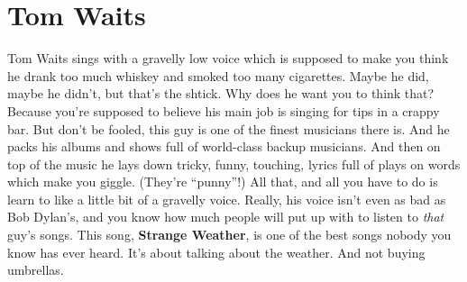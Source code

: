\documentclass[letterpaper,single]{article}
\begin{document}
\section{Tom Waits}
Tom Waits sings with a gravelly low voice which is supposed to make you
think he drank too much whiskey and smoked too many cigarettes. Maybe
he did, maybe he didn't, but that's the shtick. Why does he want you to
think that? Because you're supposed to believe his main job is singing
for tips in a crappy bar. But don't be fooled, this guy is one of the
finest musicians there is. And he packs his albums and shows full of
world-class backup musicians. And then on top of the music he lays down
tricky, funny, touching, lyrics full of plays on words which make you
giggle. (They're ``punny''!) All that, and all you have to do is learn
to like a little bit of a gravelly voice. Really, his voice isn't even
as bad as Bob Dylan's, and you know how much people will put up with to
listen to \emph{that} guy's songs. This song, \textbf{Strange Weather},
is one of the best songs nobody you know has ever heard. It's about
talking about the weather. And not buying umbrellas.
\end{document}

